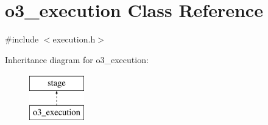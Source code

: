 \hypertarget{classo3__execution}{
\section{o3\_\-execution Class Reference}
\label{classo3__execution}
}


{\ttfamily \#include $<$execution.h$>$}

Inheritance diagram for o3\_\-execution:\begin{figure}[H]
\begin{center}
\leavevmode
\includegraphics[height=2.000000cm]{classo3__execution}
\end{center}
\end{figure}
